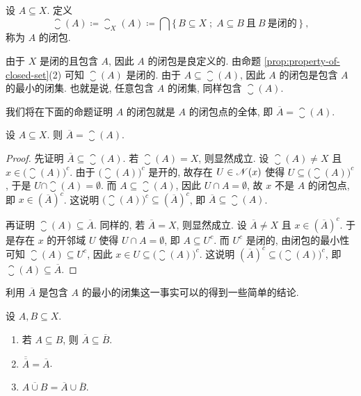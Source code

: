 \begin{definition}[闭包]
    设 \(A \subseteq X\). 定义
    \[
        \closure(A) \coloneqq \closure_X(A) \coloneqq \bigcap \{\, B \subseteq X \;;\; A \subseteq B\ \text{且}\ B\ \text{是闭的} \,\}\ ,
    \]
    称为 \(A\) 的闭包.
\end{definition}

由于 \(X\) 是闭的且包含 \(A\), 因此 \(A\) 的闭包是良定义的. 由命题 \ref{prop:property-of-closed-set}(2) 可知 \(\closure(A)\) 是闭的. 由于 \(A \subseteq \closure(A)\), 因此 \(A\) 的闭包是包含 \(A\) 的最小的闭集. 也就是说, 任意包含 \(A\) 的闭集, 同样包含 \(\closure(A)\).

我们将在下面的命题证明 \(A\) 的闭包就是 \(A\) 的闭包点的全体, 即 \(\overline A = \closure(A)\).

\begin{proposition}\label{prop:closure-and-accumulation-point}
    设 \(A \subseteq X\). 则 \(\overline A = \closure(A)\).
\end{proposition}

\begin{proof}
    先证明 \(\overline A \subseteq \closure(A)\). 若 \(\closure(A) = X\), 则显然成立. 设 \(\closure(A) \neq X\) 且 \(x \in \bigl(\closure(A)\bigr)^c\). 由于 \(\bigl(\closure(A)\bigr)^c\) 是开的, 故存在 \(U \in \mathscr N(x)\) 使得 \(U \subseteq \bigl(\closure(A)\bigr)^c\), 于是 \(U \cap \closure(A) = \emptyset\). 而 \(A \subseteq \closure(A)\), 因此 \(U \cap A = \emptyset\), 故 \(x\) 不是 \(A\) 的闭包点, 即 \(x \in (\overline A)^c\). 这说明 \(\bigl(\closure(A)\bigr)^c \subseteq (\overline A)^c\), 即 \(\overline A \subseteq \closure(A)\).

    再证明 \(\closure(A) \subseteq \overline A\). 同样的, 若 \(\overline A = X\), 则显然成立. 设 \(\overline A \neq X\) 且 \(x \in (\overline A)^c\). 于是存在 \(x\) 的开邻域 \(U\) 使得 \(U \cap A = \emptyset\), 即 \(A \subseteq U^c\). 而 \(U^c\) 是闭的, 由闭包的最小性可知 \(\closure(A) \subseteq U^c\), 因此 \(x \in U \subseteq \bigl(\closure(A)\bigr)^c\). 这说明 \((\overline A)^c \subseteq \bigl(\closure(A)\bigr)^c\), 即 \(\closure(A) \subseteq \overline A\).
\end{proof}

利用 \(\overline A\) 是包含 \(A\) 的最小的闭集这一事实可以的得到一些简单的结论.

\begin{corollary}
    设 \(A, B \subseteq X\).
    \begin{enumerate}
        \item 若 \(A \subseteq B\), 则 \(\overline A \subseteq \overline B\).
        \item \(\overline{\overline A} = \overline A\).
        \item \(\overline{A \cup B} = \overline A \cup \overline B\).
    \end{enumerate}
\end{corollary}

